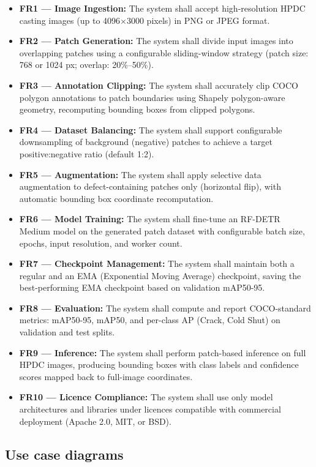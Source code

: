 \begin{itemize}[leftmargin=2em]
    \item \textbf{FR1 --- Image Ingestion:} The system shall accept high-resolution HPDC casting images (up to 4096$\times$3000 pixels) in PNG or JPEG format.
    \item \textbf{FR2 --- Patch Generation:} The system shall divide input images into overlapping patches using a configurable sliding-window strategy (patch size: 768 or 1024 px; overlap: 20\%--50\%).
    \item \textbf{FR3 --- Annotation Clipping:} The system shall accurately clip COCO polygon annotations to patch boundaries using Shapely polygon-aware geometry, recomputing bounding boxes from clipped polygons.
    \item \textbf{FR4 --- Dataset Balancing:} The system shall support configurable downsampling of background (negative) patches to achieve a target positive:negative ratio (default 1:2).
    \item \textbf{FR5 --- Augmentation:} The system shall apply selective data augmentation to defect-containing patches only (horizontal flip), with automatic bounding box coordinate recomputation.
    \item \textbf{FR6 --- Model Training:} The system shall fine-tune an RF-DETR Medium model on the generated patch dataset with configurable batch size, epochs, input resolution, and worker count.
    \item \textbf{FR7 --- Checkpoint Management:} The system shall maintain both a regular and an EMA (Exponential Moving Average) checkpoint, saving the best-performing EMA checkpoint based on validation mAP50-95.
    \item \textbf{FR8 --- Evaluation:} The system shall compute and report COCO-standard metrics: mAP50-95, mAP50, and per-class AP (Crack, Cold Shut) on validation and test splits.
    \item \textbf{FR9 --- Inference:} The system shall perform patch-based inference on full HPDC images, producing bounding boxes with class labels and confidence scores mapped back to full-image coordinates.
    \item \textbf{FR10 --- Licence Compliance:} The system shall use only model architectures and libraries under licences compatible with commercial deployment (Apache 2.0, MIT, or BSD).
\end{itemize}

\subsection{Use case diagrams}

